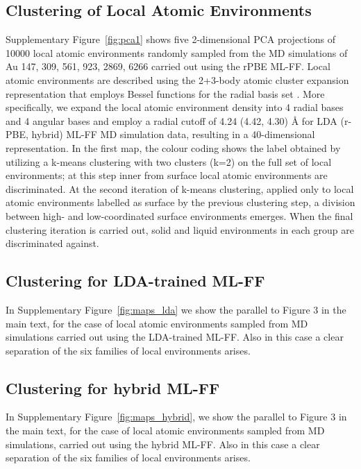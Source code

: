 \documentclass[%
aip,
 amsmath,amssymb,
 reprint,
]{revtex4-1}
\begin{document}
\subsection*{Clustering of Local Atomic Environments}
%
Supplementary Figure~\ref{fig:pca1} shows five 2-dimensional PCA projections of 10000 local atomic environments randomly sampled from the MD simulations of Au 147, 309, 561, 923, 2869, 6266 carried out using the rPBE ML-FF.
%
Local atomic environments are described using the 2+3-body atomic cluster expansion representation that employs Bessel functions for the radial basis set \cite{Drautz2019, Zeni2021}.
%
More specifically, we expand the local atomic environment density into 4 radial bases and 4 angular bases and employ a radial cutoff of 4.24 (4.42, 4.30) $\text{\AA}$ for LDA (r-PBE, hybrid) ML-FF MD simulation data, resulting in a 40-dimensional representation.
%
In the first map, the colour coding shows the label obtained by utilizing a k-means clustering with two clusters (k=2) on the full set of local environments; at this step inner from surface local atomic environments are discriminated.
%
At the second iteration of k-means clustering, applied only to local atomic environments labelled as surface by the previous clustering step, a division between high- and low-coordinated surface environments emerges. 
%
When the final clustering iteration is carried out, solid and liquid environments in each group are discriminated against.
%

\subsection*{Clustering for LDA-trained ML-FF}
%
In Supplementary Figure~\ref{fig:maps_lda} we show the parallel to Figure 3 in the main text, for the case of local atomic environments sampled from MD simulations carried out using the LDA-trained ML-FF. 
%
Also in this case a clear separation of the six families of local environments arises.
%


\subsection*{Clustering for hybrid ML-FF}
%
In Supplementary Figure~\ref{fig:maps_hybrid}, we show the parallel to Figure 3 in the main text, for the case of local atomic environments sampled from MD simulations, carried out using the hybrid ML-FF. 
%
Also in this case a clear separation of the six families of local environments arises.
%
\end{document}
